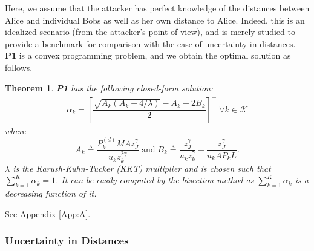 \documentclass[draftclsnofoot, 12pt, onecolumn, journal]{IEEEtran}
\newtheorem{theorem}{Theorem}
\begin{document}
Here, we assume that the attacker has perfect knowledge of the distances between Alice and individual Bobs as well as her own distance to Alice.
Indeed, this is an idealized scenario (from the attacker's point of view), and is merely studied to provide a benchmark for comparison with the case of uncertainty in distances.
\textbf{P1} is a convex programming problem, and we obtain the optimal solution as follows.
%
\begin{theorem}
\label{theo:solution}
\textbf{P1} has the following closed-form solution:
%
\begin{align}
\alpha_k = \left[ \dfrac{ \sqrt{A_k ( A_k + 4/ \lambda )} - A_k - 2 B_k}{2} \right]^+ \; \forall k \in \mathcal{K}
\end{align}
%
where $$ A_k \triangleq \frac{P_k^{(d)} M A z_J^{\gamma}}{ u_k z_k^{2\gamma} } \; \mathrm{and} \; B_k \triangleq \frac{ z_J^{\gamma} }{ u_k z_k^{\gamma} }+ \frac{ z_J^{\gamma} }{ u_k A P_k L }. $$
$\lambda$ is the \textit{Karush-Kuhn-Tucker} (KKT) multiplier and is chosen such that $\sum_{k=1}^K \alpha_k = 1 $.
It can be easily computed by the \textit{bisection} method as $\sum_{k=1}^K \alpha_k $ is a decreasing function of it.
\end{theorem}
%
\begin{IEEEproof}
See Appendix \ref{App:A}.
\end{IEEEproof}

\subsubsection{Uncertainty in Distances}
\label{sssec:uncerdis}
\end{document}
